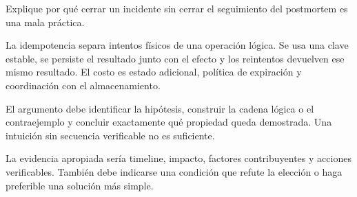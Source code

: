 \documentclass[variant=guia,cover=institutional,mode=screen]{ua-engineering-v6-article}
\begin{document}
\begin{uaexercise}
Explique por qué cerrar un incidente sin cerrar el seguimiento del postmortem es una mala práctica.
\end{uaexercise}
\begin{uaanswer}
La idempotencia separa intentos físicos de una operación lógica. Se usa una clave estable, se persiste el resultado junto con el efecto y los reintentos devuelven ese mismo resultado. El costo es estado adicional, política de expiración y coordinación con el almacenamiento.

El argumento debe identificar la hipótesis, construir la cadena lógica o el contraejemplo y concluir exactamente qué propiedad queda demostrada. Una intuición sin secuencia verificable no es suficiente.

La evidencia apropiada sería timeline, impacto, factores contribuyentes y acciones verificables. También debe indicarse una condición que refute la elección o haga preferible una solución más simple.
\end{uaanswer}
\end{document}
